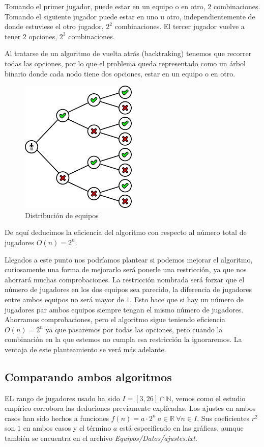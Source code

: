 Tomando el primer jugador, puede estar en un equipo o en otro, $2$ combinaciones. Tomando el siguiente jugador puede estar en uno u otro, independientemente de donde estuviese el otro jugador, $2^2$ combinaciones. El tercer jugador vuelve a tener $2$ opciones, $2^3$ combinaciones. 

Al tratarse de un algoritmo de vuelta atrás (backtraking) tenemos que recorrer todas las opciones, por lo que el problema queda representado como un árbol binario donde cada nodo tiene dos opciones, estar en un equipo o en otro.

\begin{figure}[H]
    \centering
    \includegraphics[scale=0.75]{./Imagenes/arbolbin.png}
    \caption{Distribución de equipos}
    \label{fig:arbolbin}
\end{figure}

De aquí deducimos la eficiencia del algoritmo con respecto al número total de jugadores $O(n)=2^n$.

Llegados a este punto nos podríamos plantear si podemos mejorar el algoritmo, curiosamente una forma de mejorarlo será ponerle una restricción, ya que nos ahorrará muchas comprobaciones. La restricción nombrada será forzar que el número de jugadores en los dos equipos sea parecido, la diferencia de jugadores entre ambos equipos no será mayor de $1$. Esto hace que si hay un número de jugadores par ambos equipos siempre tengan el mismo número de jugadores. 
Ahorramos comprobaciones, pero el algoritmo sigue teniendo eficiencia $O(n)=2^n$ ya que pasaremos por todas las opciones, pero cuando la combinación en la que estemos no cumpla esa restricción la ignoraremos. La ventaja de este planteamiento se verá más adelante.


\subsection{Comparando ambos algoritmos}
EL rango de jugadores usado ha sido $I=[3,26]\cap\mathbb{N}$, vemos como el estudio empírico corrobora las deduciones previamente explicadas. 
Los ajustes en ambos casos han sido hechos a funciones $f(n)=a \cdot 2^n\ a\in\mathbb{R}	\ \forall n\in I$. Sus coeficientes $r^2$ son $1$ en ambos casos y el término $a$ está especificado en las gráficas, aunque también se encuentra en el archivo \textit{Equipos/Datos/ajustes.txt}.

